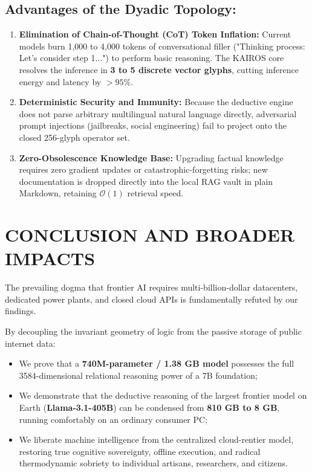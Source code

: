 \documentclass[10pt,twocolumn]{article}
\begin{document}
\subsection{Advantages of the Dyadic Topology:}
\begin{enumerate}
  \item \textbf{Elimination of Chain-of-Thought (CoT) Token Inflation:} Current models burn 1,000 to 4,000 tokens of conversational filler ("Thinking process: Let's consider step 1...") to perform basic reasoning. The KAIROS core resolves the inference in \textbf{3 to 5 discrete vector glyphs}, cutting inference energy and latency by \textbf{$> 95\%$}.
  \item \textbf{Deterministic Security and Immunity:} Because the deductive engine does not parse arbitrary multilingual natural language directly, adversarial prompt injections (jailbreaks, social engineering) fail to project onto the closed 256-glyph operator set.
  \item \textbf{Zero-Obsolescence Knowledge Base:} Upgrading factual knowledge requires zero gradient updates or catastrophic-forgetting risks; new documentation is dropped directly into the local RAG vault in plain Markdown, retaining $\mathcal{O}(1)$ retrieval speed.
\end{enumerate}



\section{CONCLUSION AND BROADER IMPACTS}

The prevailing dogma that frontier AI requires multi-billion-dollar datacenters, dedicated power plants, and closed cloud APIs is fundamentally refuted by our findings.

By decoupling the invariant geometry of logic from the passive storage of public internet data:
\begin{itemize}
  \item We prove that a \textbf{740M-parameter / 1.38 GB model} possesses the full 3584-dimensional relational reasoning power of a 7B foundation;
  \item We demonstrate that the deductive reasoning of the largest frontier model on Earth (\textbf{Llama-3.1-405B}) can be condensed from \textbf{810 GB to 8 GB}, running comfortably on an ordinary consumer PC;
  \item We liberate machine intelligence from the centralized cloud-rentier model, restoring true cognitive sovereignty, offline execution, and radical thermodynamic sobriety to individual artisans, researchers, and citizens.
\end{itemize}
\end{document}
